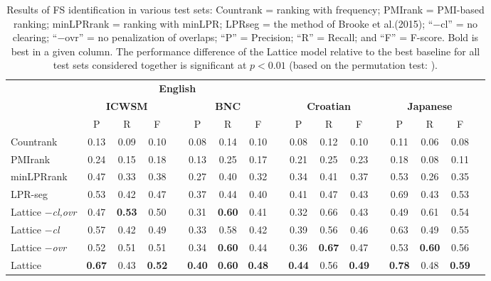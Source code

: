 \documentclass[11pt,letterpaper]{article}
\makeatletter
\def \al {al.\@ }
\makeatother
\begin{document}
 \begin{table}[!bt]
 
 \begin{center}
	 \setlength{\tabcolsep}{5.5pt}
\begin{tabular}{lcccccccccccccccc}

       \toprule
				& \multicolumn{7}{c}{\bf{English}} \\
       \cmidrule(lr){2-8}			
       & \multicolumn{3}{c}{\bf{ICWSM}} & &  \multicolumn{3}{c}{\bf{BNC}} & & \multicolumn{3}{c}{\bf{Croatian}}  && \multicolumn{3}{c}{\bf{Japanese}} \\
       \cmidrule(lr){2-4} \cmidrule(lr){6-8} \cmidrule(lr){10-12} \cmidrule(lr){14-16}
      & P & R & F &   & P & R & F &   & P & R & F &  & P & R & F \\
          \midrule 
Countrank & 0.13& 0.09 & 0.10 && 0.08 & 0.14 & 0.10 && 0.08 & 0.12 & 0.10 && 0.11 & 0.06 & 0.08 \\
PMIrank & 0.24& 0.15& 0.18 & & 0.13 & 0.25 & 0.17 & & 0.21 &0.25 & 0.23 & & 0.18& 0.08 & 0.11 \\ 
minLPRrank & 0.47& 0.33 & 0.38 & & 0.27& 0.40 & 0.32 & & 0.34 & 0.41 & 0.37 &  & 0.53 & 0.26 & 0.35 \\ 

LPR-seg  &0.53 & 0.42 & 0.47 && 0.37 & 0.44 & 0.40 & & 0.41 & 0.47  & 0.43 &  & 0.69 & 0.43 & 0.53 \\ 
  \midrule

	Lattice \emph{$-$cl,ovr} & 0.47& \bf{0.53} & 0.50 & & 0.31& \bf{0.60} & 0.41 & & 0.32 & 0.66 & 0.43 & & 0.49 & 0.61 & 0.54 \\ 

	Lattice \emph{$-$cl} & 0.57& 0.42 & 0.49 & & 0.33& 0.58 & 0.42 & & 0.39 & 0.56 & 0.46 & & 0.63 & 0.49 & 0.55 \\  	 
			
	Lattice \emph{$-$ovr} & 0.52& 0.51 & 0.51 & & 0.34& \bf{0.60} & 0.44& & 0.36 & \bf{0.67} & 0.47 & & 0.53 & \bf{0.60} & 0.56 \\  
			
				Lattice & \bf{0.67} & 0.43 & \bf{0.52} & & \bf{0.40}& \bf{0.60} & \bf{0.48} & &\bf{0.44} & 0.56 & \bf{0.49} & & \bf{0.78} & 0.48 & \bf{0.59} \\ 
            \bottomrule

 \end{tabular}
 \caption{Results of FS identification in various test sets: Countrank = ranking with frequency; PMIrank = PMI-based ranking; minLPRrank = ranking with minLPR; LPRseg = the method of Brooke et \al (2015); ``$-$cl'' = no clearing; ``$-$ovr'' = no penalization of overlaps; ``P'' = Precision; ``R'' = Recall; and ``F'' = F-score. Bold is best in a given column. The performance difference of the Lattice model relative to the best baseline for all test sets considered together is significant at $ p < 0.01$ (based on the permutation test: \protect{}).}
	 \label{tab:main}

 \end{center}


 \end{table}
\end{document}
